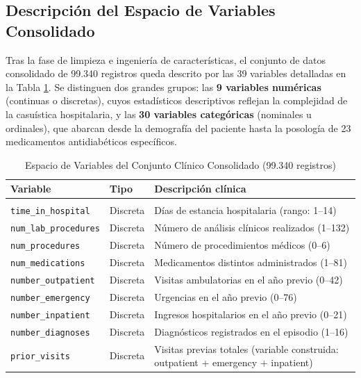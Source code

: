 \subsection{Descripción del Espacio de Variables Consolidado}

Tras la fase de limpieza e ingeniería de características, el conjunto de datos consolidado de 99.340 registros queda descrito por las 39 variables detalladas en la Tabla \ref{tab:variables}. Se distinguen dos grandes grupos: las \textbf{9 variables numéricas} (continuas o discretas), cuyos estadísticos descriptivos reflejan la complejidad de la casuística hospitalaria, y las \textbf{30 variables categóricas} (nominales u ordinales), que abarcan desde la demografía del paciente hasta la posología de 23 medicamentos antidiabéticos específicos.

\begin{table}[htbp]
\centering
\caption{Espacio de Variables del Conjunto Clínico \mbox{Consolidado} (99.340 registros)}
\label{tab:variables}
\begin{tabularx}{\textwidth}{>{\raggedright\arraybackslash}p{3.8cm} l >{\raggedright\arraybackslash}X}
\toprule
\textbf{Variable} & \textbf{Tipo} & \textbf{Descripción clínica} \\
\midrule
\multicolumn{3}{l}{\textit{Variables Numéricas}} \\
\midrule
\rowcolor{gray!10} \texttt{time\_in\_hospital} & Discreta & Días de estancia hospitalaria (rango: 1--14) \\
\texttt{num\_lab\_procedures} & Discreta & Número de análisis clínicos realizados (1--132) \\
\rowcolor{gray!10} \texttt{num\_procedures} & Discreta & Número de procedimientos médicos (0--6) \\
\texttt{num\_medications} & Discreta & Medicamentos distintos administrados (1--81) \\
\rowcolor{gray!10} \texttt{number\_outpatient} & Discreta & Visitas ambulatorias en el año previo (0--42) \\
\texttt{number\_emergency} & Discreta & Urgencias en el año previo (0--76) \\
\rowcolor{gray!10} \texttt{number\_inpatient} & Discreta & Ingresos hospitalarios en el año previo (0--21) \\
\texttt{number\_diagnoses} & Discreta & Diagnósticos registrados en el episodio (1--16) \\
\rowcolor{gray!10} \texttt{prior\_visits} & Discreta & Visitas previas totales (variable construida: outpatient + emergency + inpatient) \\

\end{tabularx}
\end{table}
